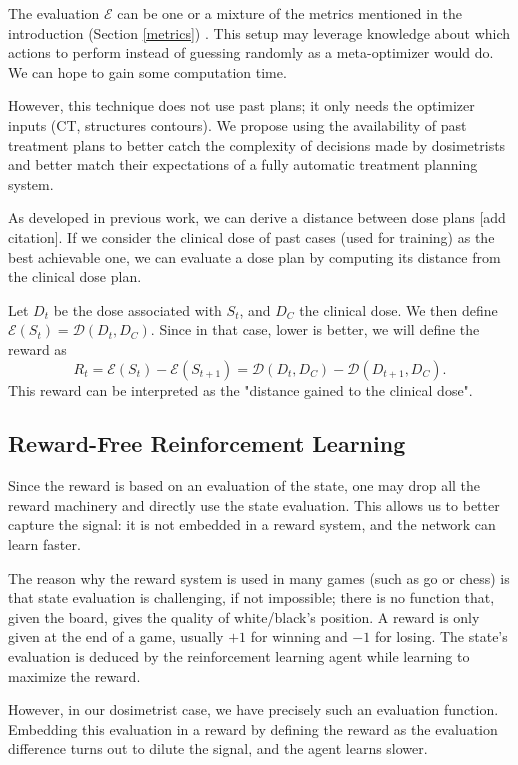 The evaluation $\mathcal{E}$ can be one or a mixture of the metrics mentioned in the introduction (Section \ref{metrics}) \cite{shen_hierarchical_2021} \cite{shen_intelligent_2019} \cite{moreau_reinforcement_2021}.
This setup may leverage knowledge about which actions to perform instead of guessing randomly as a meta-optimizer would do.
We can hope to gain some computation time.

However, this technique does not use past plans; it only needs the optimizer inputs (CT, structures contours).
We propose using the availability of past treatment plans to better catch the complexity of decisions made by dosimetrists and better match their expectations of a fully automatic treatment planning system.

As developed in previous work, we can derive a distance between dose plans [add citation].
If we consider the clinical dose of past cases (used for training) as the best achievable one, we can evaluate a dose plan by computing its distance from the clinical dose plan.

Let $D_t$ be the dose associated with $S_t$, and $D_C$ the clinical dose.
We then define $\mathcal{E}(S_t) = \mathcal{D}(D_t, D_C)$.
Since in that case, lower is better, we will define the reward as $$R_t = \mathcal{E}(S_t) - \mathcal{E}(S_{t+1}) = \mathcal{D}(D_t, D_C) - \mathcal{D}(D_{t+1}, D_C).$$
This reward can be interpreted as the "distance gained to the clinical dose".


\subsection{Reward-Free Reinforcement Learning}

Since the reward is based on an evaluation of the state, one may drop all the reward machinery and directly use the state evaluation.
This allows us to better capture the signal: it is not embedded in a reward system, and the network can learn faster.

The reason why the reward system is used in many games (such as go or chess) is that state evaluation is challenging, if not impossible; there is no function that, given the board, gives the quality of white/black's position.
A reward is only given at the end of a game, usually $+1$ for winning and $-1$ for losing.
The state's evaluation is deduced by the reinforcement learning agent while learning to maximize the reward.

However, in our dosimetrist case, we have precisely such an evaluation function.
Embedding this evaluation in a reward by defining the reward as the evaluation difference turns out to dilute the signal, and the agent learns slower.


